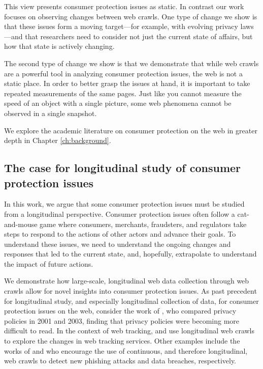 This view presents consumer protection issues as static. In contrast our work focuses on observing changes between web crawls. One type of change we show is that these issues form a moving target---for example, with evolving privacy laws---and that researchers need to consider not just the current state of affairs, but how that state is actively changing.

The second type of change we show is that we demonstrate that while web crawls are a powerful tool in analyzing consumer protection issues, the web is not a static place. In order to better grasp the issues at hand, it is important to take repeated measurements of the same pages. Just like you cannot measure the speed of an object with a single picture, some web phenomena cannot be observed in a single snapshot.

We explore the academic literature on consumer protection on the web in greater depth in Chapter \ref{ch:background}.

\subsection{The case for longitudinal study of consumer protection issues}
In this work, we argue that some consumer protection issues must be studied from a longitudinal perspective. Consumer protection issues often follow a cat-and-mouse game where consumers, merchants, fraudsters, and regulators take steps to respond to the actions of other actors and advance their goals. To understand these issues, we need to understand the ongoing changes and responses that led to the current state, and, hopefully, extrapolate to understand the impact of future actions.

We demonstrate how large-scale, longitudinal web data collection through web crawls allow for novel insights into consumer protection issues. As past precedent for longitudinal study, and especially longitudinal collection of data, for consumer protection issues on the web, consider the work of \citet{milne2006longitudinal}, who compared privacy policies in 2001 and 2003, finding that privacy policies were becoming more difficult to read. In the context of web tracking, \citet{krishnamurthy2009privacy} and \cite{sorensen2019before} use longitudinal web crawls to explore the changes in web tracking services. Other examples include the works of \citet{nathezhtha2019wc} and \citet{trabelsi2019monitoring} who encourage the use of continuous, and therefore longitudinal, web crawls to detect new phishing attacks and data breaches, respectively. 

